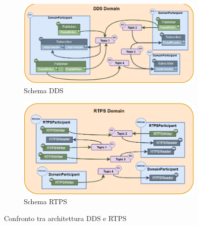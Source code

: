 \begin{figure}[H]
    \centering
    \begin{subfigure}{0.45\linewidth} %
      \centering
      \includegraphics[width=\linewidth]{./img/dds_architecture.png}
      \caption{Schema DDS}
      \label{fig:dds}
    \end{subfigure}
    \begin{subfigure}{0.45\linewidth} %
      \centering
      \includegraphics[width=\linewidth]{./img/rtps_architecture.png}
      \caption{Schema RTPS}
      \label{fig:rtps}
    \end{subfigure}
    \caption{Confronto tra architettura DDS e RTPS}
    \label{fig:confrontodds_rtps}
  \end{figure}